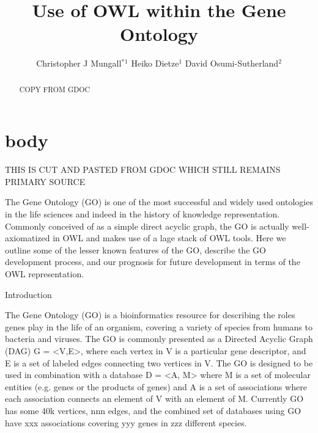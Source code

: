\documentclass{llncs}
\makeatletter
\def\correspondingauthor{$^*$}
\def\address#1{ \def\@address{\begin{hi}\footnotesize#1\end{hi}}}
\def\iid(#1){\hi$^#1$}
\makeatother
\begin{document}
%
\frontmatter          %

\title{Use of OWL within the Gene Ontology}
\author{
Christopher J Mungall\correspondingauthor$^{1}$
Heiko Dietze$^{1}$
David Osumi-Sutherland$^{2}$
}


\institute{}

\maketitle              %

\begin{abstract}

COPY FROM GDOC

\end{abstract}

\section{body}

THIS IS CUT AND PASTED FROM GDOC WHICH STILL REMAINS PRIMARY SOURCE


The Gene Ontology (GO) is one of the most successful and widely used ontologies in the life sciences and indeed in the history of knowledge representation. Commonly conceived of as a simple direct acyclic graph, the GO is actually well-axiomatized in OWL and makes use of a lage stack of OWL tools. Here we outline some of the lesser known features of the GO, describe the GO development process, and our prognosis for future development in terms of the OWL representation.

Introduction

The Gene Ontology (GO) is a bioinformatics resource for describing the roles genes play in the life of an organism, covering a variety of species from humans to bacteria and viruses. The GO is commonly presented as a Directed Acyclic Graph (DAG) G = <V,E>, where each vertex in V is a particular gene descriptor, and E is a set of labeled edges connecting two vertices in V. The GO is designed to be used in combination with a database D = <A, M> where M is a set of molecular entities (e.g. genes or the products of genes) and A is a set of associations where each association connects an element of V with an element of M. Currently GO has some 40k vertices, nnn edges, and the combined set of databases using GO have xxx associations covering yyy genes in zzz different species\cite{Blake2013}.
\end{document}
